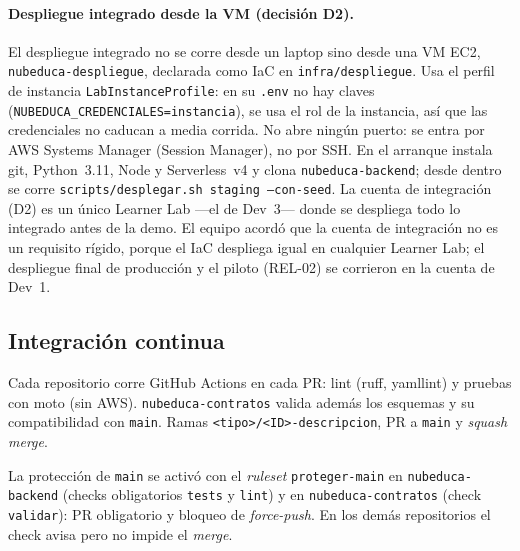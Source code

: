 \paragraph{Despliegue integrado desde la VM (decisión D2).}
El despliegue integrado no se corre desde un laptop sino desde una VM EC2,
\texttt{nubeduca-despliegue}, declarada como IaC en \texttt{infra/despliegue}. Usa el perfil de
instancia \texttt{LabInstanceProfile}: en su \texttt{.env} no hay claves
(\texttt{NUBEDUCA\_CREDENCIALES=instancia}), se usa el rol de la instancia, así que las credenciales no
caducan a media corrida. No abre ningún puerto: se entra por AWS Systems Manager (Session Manager), no
por SSH. En el arranque instala git, Python~3.11, Node y Serverless~v4 y clona
\texttt{nubeduca-backend}; desde dentro se corre \texttt{scripts/desplegar.sh staging --con-seed}. La
cuenta de integración (D2) es un único Learner Lab —el de Dev~3— donde se despliega todo lo integrado
antes de la demo. El equipo acordó que la cuenta de integración no es un requisito rígido, porque el
IaC despliega igual en cualquier Learner Lab; el despliegue final de producción y el piloto (REL-02) se
corrieron en la cuenta de Dev~1.

\subsection{Integración continua}
Cada repositorio corre GitHub Actions en cada PR: lint (ruff, yamllint) y pruebas con moto (sin AWS).
\texttt{nubeduca-contratos} valida además los esquemas y su compatibilidad con \texttt{main}. Ramas
\texttt{<tipo>/<ID>-descripcion}, PR a \texttt{main} y \textit{squash merge}.

La protección de \texttt{main} se activó con el \textit{ruleset} \texttt{proteger-main} en
\texttt{nubeduca-backend} (checks obligatorios \texttt{tests} y \texttt{lint}) y en
\texttt{nubeduca-contratos} (check \texttt{validar}): PR obligatorio y bloqueo de \textit{force-push}. En
los demás repositorios el check avisa pero no impide el \textit{merge}.

